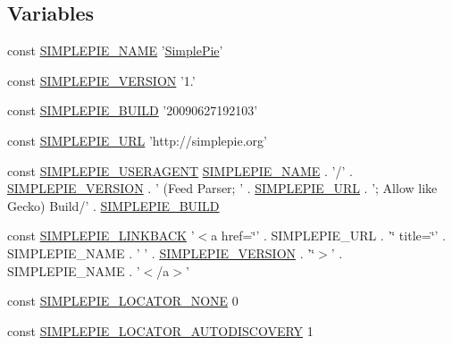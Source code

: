 \subsection*{Variables}
\begin{DoxyCompactItemize}
\item 
const \hyperlink{simplepie_8inc_ad343f27eb7687289c6a643b591f6420f}{S\-I\-M\-P\-L\-E\-P\-I\-E\-\_\-\-N\-A\-M\-E} '\hyperlink{class_simple_pie}{Simple\-Pie}'
\item 
const \hyperlink{simplepie_8inc_a02a6b6b545973012f91d3736686dc101}{S\-I\-M\-P\-L\-E\-P\-I\-E\-\_\-\-V\-E\-R\-S\-I\-O\-N} '1.'
\item 
const \hyperlink{simplepie_8inc_aa07226af0bfdcb06c21a4464624a08d2}{S\-I\-M\-P\-L\-E\-P\-I\-E\-\_\-\-B\-U\-I\-L\-D} '20090627192103'
\item 
const \hyperlink{simplepie_8inc_a90062b76fdd188ca507e7d2a2b296ce2}{S\-I\-M\-P\-L\-E\-P\-I\-E\-\_\-\-U\-R\-L} 'http\-://simplepie.\-org'
\item 
const \hyperlink{simplepie_8inc_aa16b1a92eba4943f883b1f958edba8ef}{S\-I\-M\-P\-L\-E\-P\-I\-E\-\_\-\-U\-S\-E\-R\-A\-G\-E\-N\-T} \hyperlink{simplepie_8inc_ad343f27eb7687289c6a643b591f6420f}{S\-I\-M\-P\-L\-E\-P\-I\-E\-\_\-\-N\-A\-M\-E} . '/' . \hyperlink{simplepie_8inc_a02a6b6b545973012f91d3736686dc101}{S\-I\-M\-P\-L\-E\-P\-I\-E\-\_\-\-V\-E\-R\-S\-I\-O\-N} . ' (Feed Parser; ' . \hyperlink{simplepie_8inc_a90062b76fdd188ca507e7d2a2b296ce2}{S\-I\-M\-P\-L\-E\-P\-I\-E\-\_\-\-U\-R\-L} . '; Allow like Gecko) Build/' . \hyperlink{simplepie_8inc_aa07226af0bfdcb06c21a4464624a08d2}{S\-I\-M\-P\-L\-E\-P\-I\-E\-\_\-\-B\-U\-I\-L\-D}
\item 
const \hyperlink{simplepie_8inc_ad70f2fab5f3be1c140f3d42b3229d16a}{S\-I\-M\-P\-L\-E\-P\-I\-E\-\_\-\-L\-I\-N\-K\-B\-A\-C\-K} '$<$a href=\char`\"{}' . S\-I\-M\-P\-L\-E\-P\-I\-E\-\_\-\-U\-R\-L . '\char`\"{} title=\char`\"{}' . S\-I\-M\-P\-L\-E\-P\-I\-E\-\_\-\-N\-A\-M\-E . ' ' . \hyperlink{simplepie_8inc_a02a6b6b545973012f91d3736686dc101}{S\-I\-M\-P\-L\-E\-P\-I\-E\-\_\-\-V\-E\-R\-S\-I\-O\-N} . '\char`\"{}$>$' . S\-I\-M\-P\-L\-E\-P\-I\-E\-\_\-\-N\-A\-M\-E . '$<$/a$>$'
\item 
const \hyperlink{simplepie_8inc_a09a383bfb38f1dda61a043e47dfb92a5}{S\-I\-M\-P\-L\-E\-P\-I\-E\-\_\-\-L\-O\-C\-A\-T\-O\-R\-\_\-\-N\-O\-N\-E} 0
\item 
const \hyperlink{simplepie_8inc_a3bf370e1d9a3daecaa1e3da59cff24b8}{S\-I\-M\-P\-L\-E\-P\-I\-E\-\_\-\-L\-O\-C\-A\-T\-O\-R\-\_\-\-A\-U\-T\-O\-D\-I\-S\-C\-O\-V\-E\-R\-Y} 1
\item 

\end{DoxyCompactItemize}
